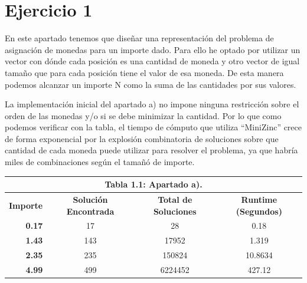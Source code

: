 \documentclass[12pt,letterpaper]{article}
\numberwithin{equation}{section} %
\numberwithin{figure}{section} %
\numberwithin{table}{section} %
\begin{document}
\section{Ejercicio 1}
En este apartado tenemos que diseñar una representación del problema de asignación
de monedas para un importe dado. Para ello he optado por utilizar un vector
con dónde cada posición es una cantidad de moneda y otro vector de igual
tamaño que para cada posición tiene el valor de esa moneda. De esta manera
podemos alcanzar un importe N como la suma de las cantidades por sus valores.
\par
La implementación inicial del apartado a) no impone ninguna restricción sobre
el orden de las monedas y/o si se debe minimizar la cantidad. Por lo que como
podemos verificar con la tabla, el tiempo de cómputo que utiliza ``MiniZinc''
crece de forma exponencial por la explosión combinatoria de soluciones sobre
que cantidad de cada moneda puede utilizar para resolver el problema, ya que
habría miles de combinaciones según el tamañó de importe.

\begin{table}[H]
    \centering
    \small
\begin{tabular}{|rccc|}
\hline
\multicolumn{4}{|c|}{\textbf{Tabla 1.1: Apartado a).}}                                                                                                                                     \\ \hline
\multicolumn{1}{|c|}{\textbf{Importe}} & \multicolumn{1}{c|}{\textbf{Solución Encontrada}} & \multicolumn{1}{c|}{\textbf{Total de Soluciones}} & \textbf{Runtime (Segundos)} \\ \hline
\multicolumn{1}{|r|}{\textbf{0.17}}    & \multicolumn{1}{c|}{17}                                   & \multicolumn{1}{c|}{28}                                  & 0.18                        \\ \hline
\multicolumn{1}{|r|}{\textbf{1.43}}    & \multicolumn{1}{c|}{143}                                  & \multicolumn{1}{c|}{17952}                               & 1.319                       \\ \hline
\multicolumn{1}{|r|}{\textbf{2.35}}    & \multicolumn{1}{c|}{235}                                  & \multicolumn{1}{c|}{150824}                              & 10.8634                     \\ \hline
\multicolumn{1}{|r|}{\textbf{4.99}}    & \multicolumn{1}{c|}{499}                                  & \multicolumn{1}{c|}{6224452}                             & 427.12                      \\ \hline
\end{tabular}
\end{table}
\end{document}
